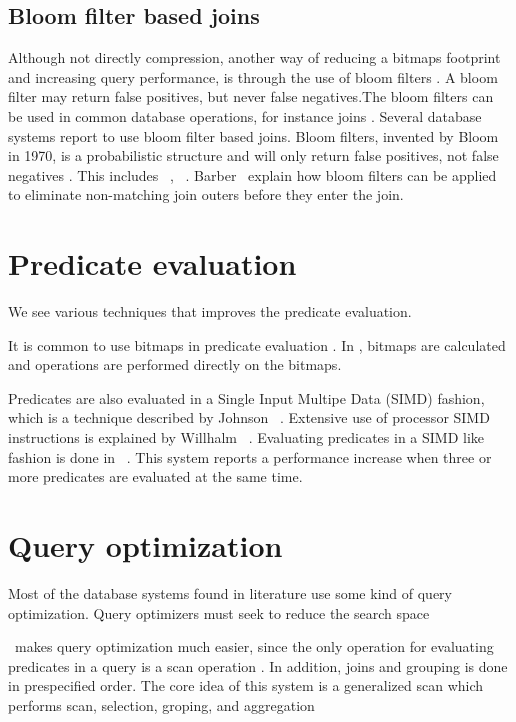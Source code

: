 \subsection{Bloom filter based joins}
\label{sub:Bloom filter based joins}
Although not directly compression, another way of reducing a bitmaps footprint and increasing query performance, is through the use of bloom filters \cite{Bloom1970-nr}. A bloom filter may return false positives, but never false negatives.The bloom filters can be used in common database operations, for instance joins \cite{x} . Several database systems report to use bloom filter based joins. Bloom filters, invented by Bloom in 1970, is a probabilistic structure and will only return false positives, not false negatives \cite{Bloom1970-nr}. This includes \oracle~\cite{Lahiri2015-mz}, \ibm~\cite{Raman2013-em}. Barber \ea~explain how bloom filters can be applied to eliminate non-matching join outers before they enter the join.

\section{Predicate evaluation}
\label{sec:Predicate evaluation}
We see various techniques that improves the predicate evaluation.

It is common to use bitmaps in predicate evaluation \cite{Raman2008-gi, Raman2013-em}. In \blink, bitmaps are calculated and operations are performed directly on the bitmaps.

Predicates are also evaluated in a Single Input Multipe Data (SIMD) fashion, which is a technique described by Johnson \ea~\cite{Johnson2008-cp}. Extensive use of processor SIMD instructions is explained by Willhalm \ea~\cite{Willhalm2009-hu, Willhalm2013-ri}. Evaluating predicates in a SIMD like fashion is done in \blink~\cite{Raman2008-gi}.  This system reports a performance increase when three or more predicates are evaluated at the same time.

\section{Query optimization}
\label{sec:Query optimization}
Most of the database systems found in literature use some kind of query optimization. Query optimizers must seek to reduce the search space \cite{Boncz2002-yj, Stonebraker2005-qz}

\blink~makes query optimization much easier, since the only operation for evaluating predicates in a query is a scan operation \cite{Barber2012-xt}. In addition, joins and grouping is done in prespecified order. The core idea of this system is a generalized scan which performs scan, selection, groping, and aggregation \cite{Raman2008-gi}


